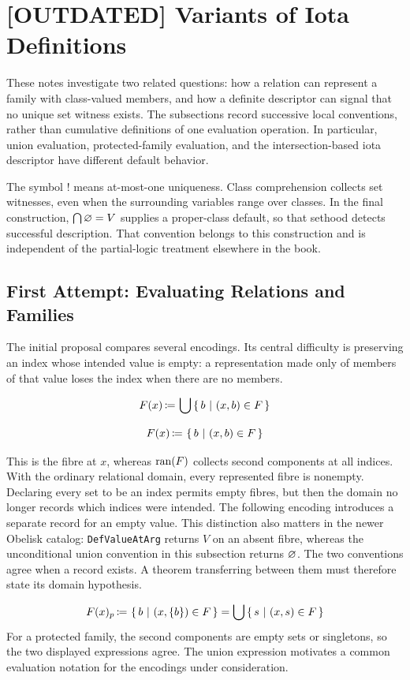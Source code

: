 \def\topic{Historical Variants of Iota and Family Evaluation}

\section{[OUTDATED] Variants of Iota Definitions}
These notes investigate two related questions: how a relation can represent
a family with class-valued members, and how a definite descriptor can signal
that no unique set witness exists. The subsections record successive local
conventions, rather than cumulative definitions of one evaluation operation.
In particular, union evaluation, protected-family evaluation, and the
intersection-based iota descriptor have different default behavior.

The symbol $!$ means at-most-one uniqueness. Class comprehension collects
set witnesses, even when the surrounding variables range over classes.
In the final construction, $\bigcap\varnothing=V$ supplies a
proper-class default, so that sethood detects successful description.
That convention belongs to this construction and is independent of the
partial-logic treatment elsewhere in the book.
\subsection{First Attempt: Evaluating Relations and Families}
The initial proposal compares several encodings. Its central difficulty is
preserving an index whose intended value is empty: a representation made
only of members of that value loses the index when there are no members.
\begin{definition}
\[
F(x)\,{\coloneqq}\, \bigcup\left\{\,b\ \middle|\ (x,b)\in F\,\right\}
\]
\end{definition}
\begin{definition}
\[
F(x) \,{\coloneqq}\, \left\{\,b\ \middle|\ (x,b)\in F\,\right\}
\]
\end{definition}
This is the fibre at $x$, whereas $\mathrm{ran}(F)$ collects second components
at all indices. With the ordinary relational domain, every represented
fibre is nonempty. Declaring every set to be an index permits empty fibres,
but then the domain no longer records which indices were intended.
The following encoding introduces a separate record for an empty value.
This distinction also matters in the newer Obelisk catalog:
\texttt{DefValueAtArg} returns $V$ on an absent fibre, whereas the
unconditional union convention in this subsection returns $\varnothing$.
The two conventions agree when a record exists. A theorem transferring
between them must therefore state its domain hypothesis.
\begin{definition}
\[
F(x)_p \,{\coloneqq}\, \left\{\,b\ \middle|\ (x,\{b\})\in F\,\right\}
= \bigcup\left\{\,s\ \middle|\ (x,s)\in F\,\right\}
\]
For a protected family, the second components are empty sets or singletons,
so the two displayed expressions agree. The union expression motivates a
common evaluation notation for the encodings under consideration.
\end{definition}



